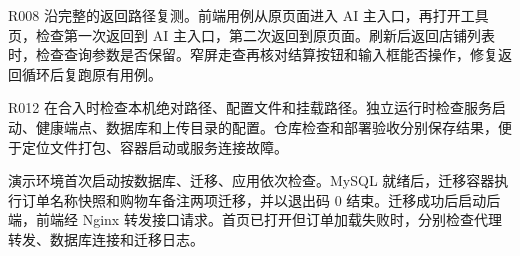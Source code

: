 R008 沿完整的返回路径复测。前端用例从原页面进入 AI 主入口，再打开工具页，检查第一次返回到 AI 主入口，第二次返回到原页面。刷新后返回店铺列表时，检查查询参数是否保留。窄屏走查再核对结算按钮和输入框能否操作，修复返回循环后\mbox{复跑原有用例}。

R012 在合入时检查本机绝对路径、配置文件和挂载路径。独立运行时检查服务启动、健康端点、数据库和上传目录的配置。仓库检查和部署验收分别保存结果，便于定位文件打包、容器启动或服务连接故障。

演示环境首次启动按数据库、迁移、应用依次检查。MySQL 就绪后，迁移容器执行订单名称快照和购物车备注两项迁移，并以退出码 0 结束。迁移成功后启动后端，前端经 Nginx 转发接口请求。首页已打开但订单加载失败时，分别检查代理转发、数据库连接和迁移日志。
